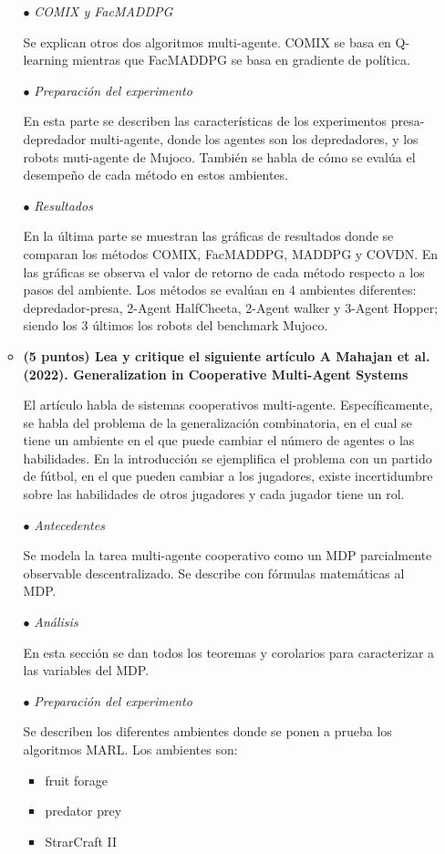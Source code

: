 \documentclass[a4paper,10pt]{article}
\begin{document}
\begin{enumerate}
\begin{itemize}
  	  $\bullet$ \textit{COMIX y FacMADDPG}
  	  
  	  Se explican otros dos algoritmos multi-agente. COMIX se basa en Q-learning mientras que FacMADDPG se basa en gradiente de política.
  	  
  	  $\bullet$ \textit{Preparación del experimento}
  	  
  	  En esta parte se describen las características de los experimentos presa-depredador multi-agente, donde los agentes son los depredadores, y los robots muti-agente de Mujoco. También se habla de cómo se evalúa el desempeño de cada método en estos ambientes.
  	  
  	  $\bullet$ \textit{Resultados}
  	  
  	  En la última parte se muestran las gráficas de resultados donde se comparan los métodos COMIX, FacMADDPG, MADDPG y COVDN. En las gráficas se observa el valor de retorno de cada método respecto a los pasos del ambiente. Los métodos se evalúan en 4 ambientes diferentes: depredador-presa, 2-Agent HalfCheeta, 2-Agent walker y 3-Agent Hopper; siendo los 3 últimos los robots del benchmark Mujoco.
	  
	  \item \textbf{(5 puntos) Lea y critique el siguiente artículo A Mahajan et al. (2022). Generalization in Cooperative Multi-Agent Systems}
	  
	  El artículo habla de sistemas cooperativos multi-agente. Específicamente, se habla del problema de la generalización combinatoria, en el cual se tiene un ambiente en el que puede cambiar el número de agentes o las habilidades. En la introducción se ejemplifica el problema con un partido de fútbol, en el que pueden cambiar a los jugadores, existe incertidumbre sobre las habilidades de otros jugadores y cada jugador tiene un rol.
	  
	  $\bullet$ \textit{Antecedentes}
	  
	  Se modela la tarea multi-agente cooperativo como un MDP parcialmente observable descentralizado. Se describe con fórmulas matemáticas al MDP.
	  
	  $\bullet$ \textit{Análisis}
	  
	  En esta sección se dan todos los teoremas y corolarios para caracterizar a las variables del MDP.
	  
	  $\bullet$ \textit{Preparación del experimento}
	  
	  Se describen los diferentes ambientes donde se ponen a prueba los algoritmos MARL. Los ambientes son:
	  \begin{itemize}
	  \item fruit forage
	  \item predator prey
	  \item StrarCraft II
	  \end{itemize}
	  

\end{itemize}
\end{enumerate}
\end{document}

